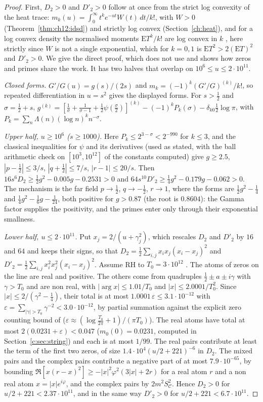 \begin{proof}
First, $D_2>0$ and $D'_2>0$ follow at once from the strict log convexity of the heat trace: $m_k(u)=\int_0^\infty t^ke^{-ut}W(t)\,dt/k!$, with $W>0$ (Theorem~\ref{thm:ch12:idsd}) and strictly log convex \cite[Theorem 7.3]{P17} (Section~\ref{ch:heat}), and for a log convex density the normalised moments $\mathrm ET^k/k!$ are log convex in $k$ \cite{BarlowProschan75}, here strictly since $W$ is not a single exponential, which for $k=0,1$ is $\mathrm ET^2>2(\mathrm ET)^2$ and $D'_2>0$. We give the direct proof, which does not use \cite{P17} and shows how zeros and primes share the work. It has two halves that overlap on $10^6\le u\le2\cdot10^{11}$.

\emph{Closed forms.} $G'/G(u)=g(s)/(2s)$ and $m_k=(-1)^k(G'/G)^{(k)}/k!$, so repeated differentiation in $u=s^2$ gives the displayed forms. For $s>\frac12$ and $\sigma=\frac12+s$, $g^{(k)}=[\frac1\sigma+\frac1{\sigma-1}+\frac12\psi(\frac\sigma2)]^{(k)}-(-1)^kP_k(\sigma)-\delta_{k0}\frac12\log\pi$, with $P_k=\sum_n\Lambda(n)(\log n)^kn^{-\sigma}$.

\emph{Upper half, $u\ge10^6$ ($s\ge1000$).} Here $P_k\le2^{3-\sigma}<2^{-990}$ for $k\le3$, and the classical inequalities for $\psi$ and its derivatives (used as stated, with the ball arithmetic check on $[10^3,10^{12}]$ of the constants computed) give $g\ge2.5$, $|p-\frac12|\le3/s$, $|q+\frac12|\le7/s$, $|r-1|\le20/s$. Then $16s^6D_2\ge\frac12g^2-0.005g-0.2531>0$ and $64s^{10}D'_2\ge\frac14g^2-0.179g-0.062>0$. The mechanism is the far field $p\to\frac12$, $q\to-\frac12$, $r\to1$, where the forms are $\frac12g^2-\frac14$ and $\frac14g^2-\frac16g-\frac1{24}$, both positive for $g>0.87$ (the root is $0.8604$): the Gamma factor supplies the positivity, and the primes enter only through their exponential smallness.

\emph{Lower half, $u\le2\cdot10^{11}$.} Put $x_j=2/(u+\gamma_j^2)$, which rescales $D_2$ and $D'_2$ by $16$ and $64$ and keeps their signs, so that $D_2=\frac12\sum_{i,j}x_ix_j(x_i-x_j)^2$ and $D'_2=\frac12\sum_{i,j}x_i^2x_j^2(x_i-x_j)^2$. Assume RH to $T_0=3\cdot10^{12}$ \cite{PT21}. The atoms of zeros on the line are real and positive. The others come from quadruples $\frac12\pm a\pm i\gamma$ with $\gamma>T_0$ and are non real, with $|\arg x|\le1.01/T_0$ and $|x|\le2.0001/T_0^2$. Since $|x|\le2/(\gamma^2-\frac14)$, their total is at most $1.0001\,\varepsilon\le3.1\cdot10^{-12}$ with $\varepsilon=\sum_{|\gamma|>T_0}\gamma^{-2}<3.0\cdot10^{-12}$, by partial summation against the explicit zero counting bound of \cite{HSW22} ($\varepsilon\approx(\log\frac{T_0}{2\pi}+1)/(\pi T_0)$). The real atoms have total at most $2(0.0231+\varepsilon)<0.047$ ($m_0(0)=0.0231$, computed in Section~\ref{c:sec:string}) and each is at most $1/99$. The real pairs contribute at least the term of the first two zeros, of size $1.4\cdot10^4(u/2+221)^{-6}$ in $D_2$. The mixed pairs and the complex pairs contribute a negative part of at most $7.9\cdot10^{-65}$, by bounding $\Re[x(r-x)^2]\ge-|x|^2\varphi^2(3|x|+2r)$ for a real atom $r$ and a non real atom $x=|x|e^{i\varphi}$, and the complex pairs by $2m^2S_{\mathcal C}^2$. Hence $D_2>0$ for $u/2+221<2.37\cdot10^{11}$, and in the same way $D'_2>0$ for $u/2+221<6.7\cdot10^{11}$.


\end{proof}
